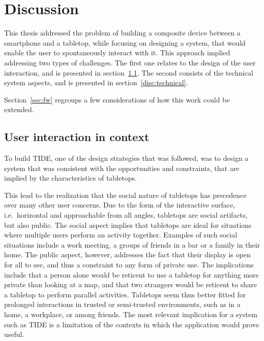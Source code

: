 \chapter{Discussion}
\label{discussion}

This thesis addressed the problem of building a composite device between a smartphone and a tabletop, while focusing on designing a system, that would enable the user to spontaneously interact with it.
This approach implied addressing two types of challenges.
The first one relates to the design of the user interaction, and is presented in section~\ref{disc:ui}.
The second consists of the technical system aspects, and is presented in section~\ref{disc:technical}.

Section~\ref{sec:fw} regroups a few considerations of how this work could be extended.

\section{User interaction in context}
\label{disc:ui}

To build TIDE, one of the design strategies that was followed, was to design a system that was consistent with the opportunities and constraints, that are implied by the characteristics of tabletops.

This lead to the realization that the social nature of tabletops has precedence over many other user concerns.
Due to the form of the interactive surface, i.e.\ horizontal and approachable from all angles, tabletops are social artifacts,  but also public.
The social aspect implies that tabletops are ideal for situations where multiple users perform an activity together.
Examples of such social situations include a work meeting, a groups of friends in a bar or a family in their home.
The public aspect, however, addresses the fact that their display is open for all to see, and thus a constraint to any form of private use.
The implications include that a person alone would be reticent to use a tabletop for anything more private than looking at a map, and that two strangers would be reticent to share a tabletop to perform parallel activities.
Tabletops seem thus better fitted for prolonged interactions in trusted or semi-trusted environments, such as in a home, a workplace, or among friends.
The most relevant implication for a system such as TIDE is a limitation of the contexts in which the application would prove useful.

